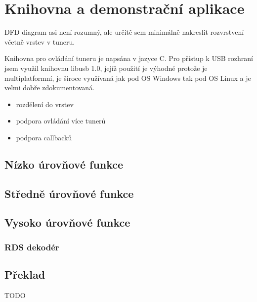 \section{Knihovna a demonstrační aplikace}
\label{sec:knihovna}
DFD diagram asi není rozumný, ale určitě sem minimálně nakreslit rozvrstvení včetně vrstev v tuneru.

Knihovna pro ovládání tuneru je napsána v jazyce C. Pro přístup k USB rozhraní jsem využil knihovnu libusb 1.0, jejíž použití je výhodné protože je multiplatformní, je široce využívaná jak pod OS Windows tak pod OS Linux a je velmi dobře zdokumentovaná.

\begin{itemize}
\item rozdělení do vrstev
\item podpora ovládání více tunerů
\item podpora callbacků
\end{itemize}

\subsection{Nízko úrovňové funkce}

\subsection{Středně úrovňové funkce}

\subsection{Vysoko úrovňové funkce}
\subsubsection{RDS dekodér}

\subsection{Překlad}
TODO